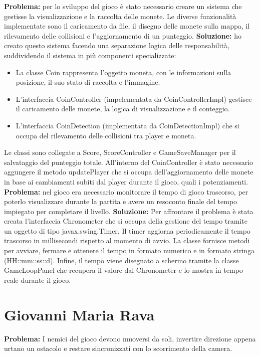 \documentclass[a4paper,12pt]{report}
\begin{document}
\newpage
\textbf{Problema:} per lo sviluppo del gioco è stato necessario creare un sistema che gestisse la visualizzazione e la raccolta delle monete.
Le diverse funzionalità implementate sono il caricamento da file, il disegno delle monete sulla mappa, il rilevamento delle collisioni e 
l'aggiornamento di un punteggio.
\textbf{Soluzione:} ho creato questo sistema facendo una separazione logica delle responsabilità, suddividendo il sistema in più componenti
specializzate:
\begin{itemize}
    \item La classe Coin rappresenta l'oggetto moneta, con le informazioni sulla posizione, il suo stato di raccolta e l'immagine.
    \item L'interfaccia CoinController (impelementata da CoinControllerImpl) gestisce il caricamento delle monete, la logica di visualizzazione
    e il conteggio.
    \item L'interfaccia CoinDetection (implementata da CoinDetectionImpl) che si occupa del rilevamento delle collisioni tra player e moneta.
\end{itemize}
Le classi sono collegate a Score, ScoreController e GameSaveManager per il salvataggio del punteggio totale.
All'interno del CoinController è stato necessario aggungere il metodo updatePlayer che si occupa dell'aggiornamento delle monete in base ai 
cambiamenti subiti dal player durante il gioco, quali i potenziamenti.
\textbf{Problema:} nel gioco era necessario monitorare il tempo di gioco trascorso, per poterlo visualizzare durante la partita e avere un 
resoconto finale del tempo impiegato per completare il livello. 
\textbf{Soluzione:} Per affrontare il problema è stata creata l'interfaccia Chronometer che si occupa della gestione del tempo tramite un 
oggetto di tipo javax.swing.Timer. Il timer aggiorna periodicamente il tempo trascorso in millisecondi rispetto al momento di avvio. La
classe fornisce metodi per avviare, fermare e ottenere il tempo in formato numerico e in formato stringa (HH::mm::ss::d). Infine, il tempo 
viene disegnato a schermo tramite la classe GameLoopPanel che recupera il valore dal Chronometer e lo mostra in tempo reale durante il gioco.

\section{Giovanni Maria Rava}
\textbf{Problema:} I nemici del gioco devono muoversi da soli, invertire direzione appena urtano un ostacolo e restare sincronizzati con 
lo scorrimento della camera. 
\end{document}
